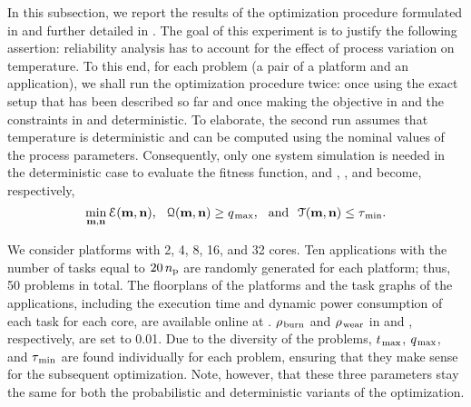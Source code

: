 In this subsection, we report the results of the optimization procedure formulated in  and further detailed in .
The goal of this experiment is to justify the following assertion: reliability analysis has to account for the effect of process variation on temperature.
To this end, for each problem (a pair of a platform and an application), we shall run the optimization procedure twice: once using the exact setup that has been described so far and once making the objective in  and the constraints in  and  deterministic.
To elaborate, the second run assumes that temperature is deterministic and can be computed using the nominal values of the process parameters.
Consequently, only one system simulation is needed in the deterministic case to evaluate the fitness function, and , , and  become, respectively,
\[
  \min_{\mathbf{m}, \mathbf{n}} \EuScript{E}(\mathbf{m}, \mathbf{n}), \hspace{0.7em} \EuScript{Q}(\mathbf{m}, \mathbf{n}) \geq q_{\text{\kern0.1emmax}}, \hspace{0.7em} \text{and} \hspace{0.7em} \EuScript{T}(\mathbf{m}, \mathbf{n}) \leq \tau_{\text{\kern0.1emmin}}.
\]


We consider platforms with 2, 4, 8, 16, and 32 cores.
Ten applications with the number of tasks equal to $20 \, {n_\text{p}}$ are randomly generated for each platform; thus, 50 problems in total.
The floorplans of the platforms and the task graphs of the applications, including the execution time and dynamic power consumption of each task for each core, are available online at \cite{sources}.
$\rho_{\text{\kern0.1emburn}}$ and $\rho_{\text{\kern0.1emwear}}$ in  and , respectively, are set to 0.01.
Due to the diversity of the problems, $t_{\text{\kern0.1emmax}}$, $q_{\text{\kern0.1emmax}}$, and $\tau_{\text{\kern0.1emmin}}$ are found individually for each problem, ensuring that they make sense for the subsequent optimization.
Note, however, that these three parameters stay the same for both the probabilistic and deterministic variants of the optimization.

